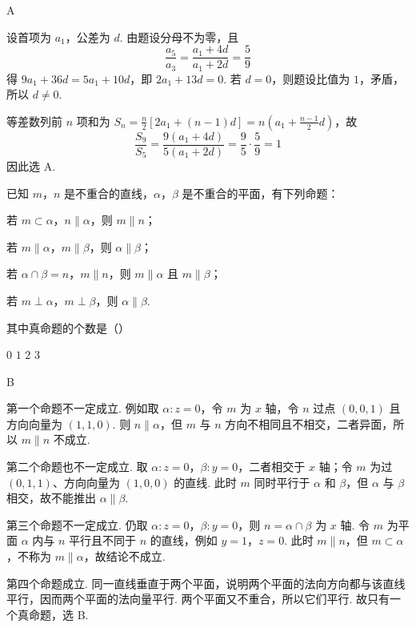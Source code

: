 \begin{answer}
A
\end{answer}

\begin{solution}
设首项为 \(a_1\)，公差为 \(d\). 由题设分母不为零，且
\[
\frac{a_5}{a_3}=\frac{a_1+4d}{a_1+2d}=\frac59
\]
得 \(9a_1+36d=5a_1+10d\)，即 \(2a_1+13d=0\). 若 \(d=0\)，则题设比值为 \(1\)，矛盾，所以 \(d\neq0\).

等差数列前 \(n\) 项和为 \(S_n=\frac n2[2a_1+(n-1)d]=n\left(a_1+\frac{n-1}{2}d\right)\)，故
\[
\frac{S_9}{S_5}=\frac{9(a_1+4d)}{5(a_1+2d)}=\frac95\cdot\frac59=1
\]
因此选 A.
\end{solution}

\begin{problem}
已知 \(m\)，\(n\) 是不重合的直线，\(\alpha\)，\(\beta\) 是不重合的平面，有下列命题：

\begin{circlelist}
\item 若 \(m \subset \alpha\)，\(n \parallel \alpha\)，则 \(m \parallel n\)；
\item 若 \(m \parallel \alpha\)，\(m \parallel \beta\)，则 \(\alpha \parallel \beta\)；
\item 若 \(\alpha \cap \beta = n\)，\(m \parallel n\)，则 \(m \parallel \alpha\) 且 \(m \parallel \beta\)；
\item 若 \(m \perp \alpha\)，\(m \perp \beta\)，则 \(\alpha \parallel \beta\).
\end{circlelist}

其中真命题的个数是（\quad）

\choices
    {\(0\)}
    {\(1\)}
    {\(2\)}
    {\(3\)}
\end{problem}

\begin{answer}
B
\end{answer}

\begin{solution}
第一个命题不一定成立. 例如取 \(\alpha:z=0\)，令 \(m\) 为 \(x\) 轴，令 \(n\) 过点 \((0,0,1)\) 且方向向量为 \((1,1,0)\). 则 \(n\parallel\alpha\)，但 \(m\) 与 \(n\) 方向不相同且不相交，二者异面，所以 \(m\parallel n\) 不成立.

第二个命题也不一定成立. 取 \(\alpha:z=0\)，\(\beta:y=0\)，二者相交于 \(x\) 轴；令 \(m\) 为过 \((0,1,1)\)、方向向量为 \((1,0,0)\) 的直线. 此时 \(m\) 同时平行于 \(\alpha\) 和 \(\beta\)，但 \(\alpha\) 与 \(\beta\) 相交，故不能推出 \(\alpha\parallel\beta\).

第三个命题不一定成立. 仍取 \(\alpha:z=0\)，\(\beta:y=0\)，则 \(n=\alpha\cap\beta\) 为 \(x\) 轴. 令 \(m\) 为平面 \(\alpha\) 内与 \(n\) 平行且不同于 \(n\) 的直线，例如 \(y=1\)，\(z=0\). 此时 \(m\parallel n\)，但 \(m\subset\alpha\)，不称为 \(m\parallel\alpha\)，故结论不成立.

第四个命题成立. 同一直线垂直于两个平面，说明两个平面的法向方向都与该直线平行，因而两个平面的法向量平行. 两个平面又不重合，所以它们平行. 故只有一个真命题，选 B.
\end{solution}


